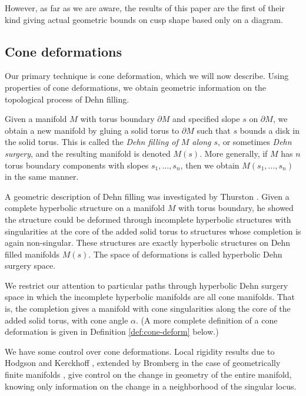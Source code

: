 However, as far as we are aware, the results of this paper are the
first of their kind giving actual geometric bounds on cusp shape based
only on a diagram.


\subsection{Cone deformations}

Our primary technique is cone deformation, which we will now describe.
Using properties of cone deformations, we obtain geometric information
on the topological process of Dehn filling.

\begin{define}
  Given a manifold $M$ with torus boundary $\partial M$ and specified
  slope $s$ on $\partial M$, we obtain a new manifold by gluing a
  solid torus to $\partial M$ such that $s$ bounds a disk in the solid
  torus.  This is called the \emph{Dehn filling of $M$ along $s$}, or
  sometimes \emph{Dehn surgery}, and the resulting manifold is denoted
  $M(s)$.  More generally, if $M$ has $n$ torus boundary components
  with slopes $s_1, \dots, s_n$, then we obtain $M(s_1, \dots, s_n)$
  in the same manner.
\label{def:dehn}
\end{define}

A geometric description of Dehn filling was investigated by Thurston
\cite{thurston}.  Given a complete hyperbolic structure on a manifold
$M$ with torus boundary, he showed the structure could be deformed
through incomplete hyperbolic structures with singularities at the
core of the added solid torus to structures whose completion is again
non-singular.  These structures are exactly hyperbolic structures on
Dehn filled manifolds $M(s)$.  The space of deformations is called
hyperbolic Dehn surgery space.

We restrict our attention to particular paths through hyperbolic Dehn
surgery space in which the incomplete hyperbolic manifolds are all
cone manifolds.  That is, the completion gives a manifold with cone
singularities along the core of the added solid torus, with cone angle
$\alpha$.  (A more complete definition of a cone deformation is given
in Definition \ref{def:cone-deform} below.)

We have some control over cone deformations.  Local rigidity results
due to Hodgson and Kerckhoff \cite{hk:cone-rigid}, extended by
Bromberg in the case of geometrically finite manifolds
\cite{bromberg:cone-rigid}, give control on the change in geometry of
the entire manifold, knowing only information on the change in a
neighborhood of the singular locus.

